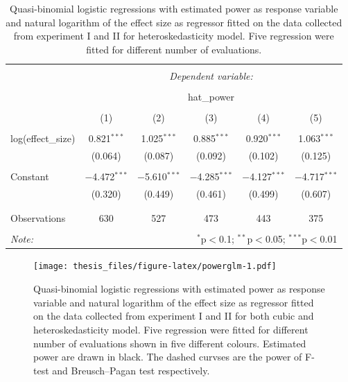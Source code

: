 \documentclass{monashthesis}
\theoremstyle{definition}
\theoremstyle{definition}
\theoremstyle{definition}
\theoremstyle{definition}
\theoremstyle{remark}
\begin{document}
\begin{table}[!htbp] \centering 
  \caption{Quasi-binomial logistic regressions with estimated power as response variable and natural logarithm of the effect size as regressor fitted on the data collected from experiment I and II for heteroskedasticity model. Five regression were fitted for different number of evaluations.} 
  \label{tab:powerglmheter} 
\begin{tabular}{@{\extracolsep{5pt}}lccccc} 
\\[-1.8ex]\hline 
\hline \\[-1.8ex] 
 & \multicolumn{5}{c}{\textit{Dependent variable:}} \\ 
\cline{2-6} 
\\[-1.8ex] & \multicolumn{5}{c}{hat\_power} \\ 
\\[-1.8ex] & (1) & (2) & (3) & (4) & (5)\\ 
\hline \\[-1.8ex] 
 log(effect\_size) & 0.821$^{***}$ & 1.025$^{***}$ & 0.885$^{***}$ & 0.920$^{***}$ & 1.063$^{***}$ \\ 
  & (0.064) & (0.087) & (0.092) & (0.102) & (0.125) \\ 
  & & & & & \\ 
 Constant & $-$4.472$^{***}$ & $-$5.610$^{***}$ & $-$4.285$^{***}$ & $-$4.127$^{***}$ & $-$4.717$^{***}$ \\ 
  & (0.320) & (0.449) & (0.461) & (0.499) & (0.607) \\ 
  & & & & & \\ 
\hline \\[-1.8ex] 
Observations & 630 & 527 & 473 & 443 & 375 \\ 
\hline 
\hline \\[-1.8ex] 
\textit{Note:}  & \multicolumn{5}{r}{$^{*}$p$<$0.1; $^{**}$p$<$0.05; $^{***}$p$<$0.01} \\ 
\end{tabular} 
\end{table}

\begin{figure}
\centering
\texttt{[image: thesis\_files/figure-latex/powerglm-1.pdf]}
\caption{\label{fig:powerglm}Quasi-binomial logistic regressions with estimated power as response variable and natural logarithm of the effect size as regressor fitted on the data collected from experiment I and II for both cubic and heteroskedasticity model. Five regression were fitted for different number of evaluations shown in five different colours. Estimated power are drawn in black. The dashed curvses are the power of F-test and Breusch--Pagan test respectively.}
\end{figure}
\end{document}
